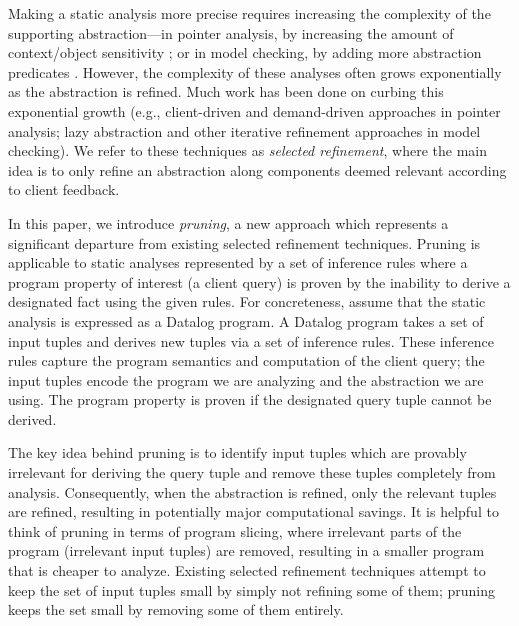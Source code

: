 
Making a static analysis more precise requires increasing the complexity of the
supporting abstraction---in pointer analysis, by increasing the amount of
context/object sensitivity \cite{kcfa, kobj, MilanovaRountevRyder2005,
WhaleyLam2004, LhotakHendren2006, LhotakHendren2008}; or in model checking, by
adding more abstraction predicates \cite{graf97predicate,slam}.
However, the complexity of these analyses often grows exponentially as the
abstraction is refined.
Much work has been done on curbing this exponential growth
(e.g., client-driven \cite{GuyerLin2003} and demand-driven
\cite{HeintzeTardieu2001} approaches in pointer analysis;
lazy abstraction \cite{henzinger02lazy,mcmillan06lazy} and other iterative refinement approaches in model checking).
We refer to these techniques as {\em selected refinement},
where the main idea is to only refine an abstraction along components
deemed relevant according to client feedback.

In this paper, we introduce {\em pruning}, a new approach which represents a
significant departure from existing selected refinement techniques.  Pruning is
applicable to static analyses represented by a set of inference rules where a
program property of interest (a client query) is proven by the inability to
derive a designated fact using the given rules.  For concreteness, assume that
the static analysis is expressed as a Datalog program.  A Datalog program takes
a set of input tuples and derives new tuples via a set of inference rules.
These inference rules capture the program semantics and computation of the
client query; the input tuples encode the program we are analyzing and the
abstraction we are using.  The program property is proven if the
designated query tuple cannot be derived.

The key idea behind pruning is to identify input tuples which are provably
irrelevant for deriving the query tuple and remove these tuples completely from
analysis.  Consequently, when the abstraction is refined, only the relevant
tuples are refined, resulting in potentially major computational savings.  It
is helpful to think of pruning in terms of program slicing, where
irrelevant parts of the program (irrelevant input tuples) are removed,
resulting in a smaller program that is cheaper to analyze.  Existing selected
refinement techniques attempt to keep the set of input tuples small by simply
not refining some of them; pruning keeps the set small by removing some of them
entirely.

